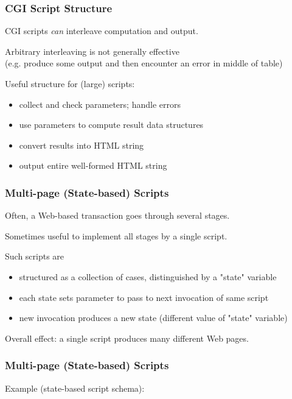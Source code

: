 \begin{frame}
\frametitle{CGI Script Structure}
CGI scripts {\it{can}} interleave computation and output.

Arbitrary interleaving is not generally effective \\
{\small (e.g. produce some output and then encounter an error in middle of table)}

Useful structure for (large) scripts:
\begin{itemize}
\item  collect and check parameters; handle errors
\item  use parameters to compute result data structures
\item  convert results into HTML string
\item  output entire well-formed HTML string
\end{itemize}
\end{frame}

\begin{frame}
\frametitle{Multi-page (State-based) Scripts}
Often, a Web-based transaction goes through several stages.

Sometimes useful to implement all stages by a single script.

Such scripts are
\begin{itemize}
\item  structured as a collection of cases, distinguished by a "state" variable
\item  each state sets parameter to pass to next invocation of same script
\item  new invocation produces a new state (different value of "state" variable)
\end{itemize}
Overall effect: a single script produces many different Web pages.
\end{frame}

\begin{frame}[fragile]
\frametitle{Multi-page (State-based) Scripts}
Example (state-based script schema):

\end{frame}

